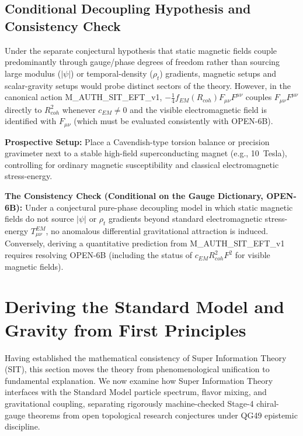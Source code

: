 \documentclass[american,11pt,letterpaper]{article}
\def\mathrm#1{#1}%
\def\texttt#1{#1}%
\begin{document}
\subsection{Conditional Decoupling Hypothesis and Consistency Check}

Under the separate conjectural hypothesis that static magnetic fields couple predominantly through gauge/phase degrees of freedom rather than sourcing large modulus ($|\psi|$) or temporal-density ($\rho_t$) gradients, magnetic setups and scalar-gravity setups would probe distinct sectors of the theory. However, in the canonical action \texttt{M\_AUTH\_SIT\_EFT\_v1}, $-\frac{1}{4}f_{\mathrm{EM}}(R_{\mathrm{coh}})F_{\mu\nu}F^{\mu\nu}$ couples $F_{\mu\nu}F^{\mu\nu}$ directly to $R_{\mathrm{coh}}^2$ whenever $c_{\mathrm{EM}} \ne 0$ and the visible electromagnetic field is identified with $F_{\mu\nu}$ (which must be evaluated consistently with \texttt{OPEN-6B}).

\textbf{Prospective Setup:} Place a Cavendish-type torsion balance or precision gravimeter next to a stable high-field superconducting magnet (e.g., 10~Tesla), controlling for ordinary magnetic susceptibility and classical electromagnetic stress-energy.

\textbf{The Consistency Check (Conditional on the Gauge Dictionary, \texttt{OPEN-6B}):} Under a conjectural pure-phase decoupling model in which static magnetic fields do not source $|\psi|$ or $\rho_t$ gradients beyond standard electromagnetic stress-energy $T_{\mu\nu}^{\mathrm{EM}}$, no anomalous differential gravitational attraction is induced. Conversely, deriving a quantitative prediction from \texttt{M\_AUTH\_SIT\_EFT\_v1} requires resolving \texttt{OPEN-6B} (including the status of $c_{\mathrm{EM}} R_{\mathrm{coh}}^2 F^2$ for visible magnetic fields).


\section{Deriving the Standard Model and Gravity from First Principles}
\label{sec:emergence_sm_g_moved}
\label{sec:vortical_defects}

Having established the mathematical consistency of Super Information Theory (SIT), this section moves the theory from phenomenological unification to fundamental explanation.
We now examine how Super Information Theory interfaces with the Standard Model particle spectrum, flavor mixing, and gravitational coupling, separating rigorously machine-checked Stage-4 chiral-gauge theorems from open topological research conjectures under \texttt{QG49} epistemic discipline.
\end{document}
